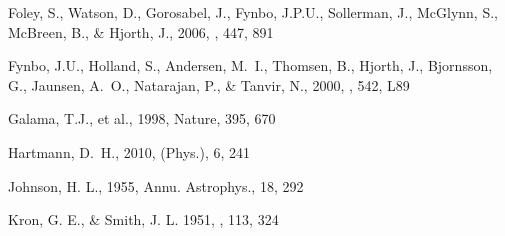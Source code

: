 


 Foley, S., Watson, D., Gorosabel, J., Fynbo, J.P.U., Sollerman, J., McGlynn, S., McBreen, B., \& Hjorth, J., 2006, \aap, 447, 891

 Fynbo, J.U., Holland, S., Andersen, M.~I., Thomsen, B., Hjorth, J., Bjornsson, G., Jaunsen, A.~O., Natarajan, P.,
\& Tanvir, N., 2000, \apj, 542, L89

 Galama, T.J., et al., 1998, Nature, 395, 670


 Hartmann, D.~H., 2010, \nat (Phys.), 6, 241
 
 


 
 
 

 Johnson, H. L., 1955, Annu. Astrophys., 18, 292
 

 Kron, G. E., \& Smith, J. L. 1951, \apj, 113, 324

